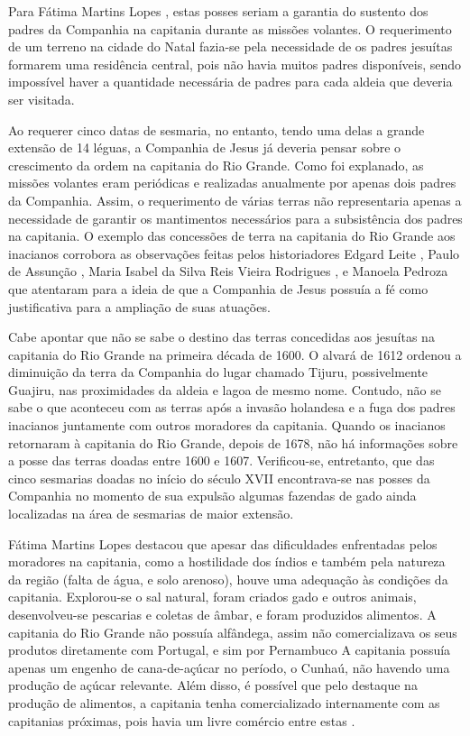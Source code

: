 Para Fátima Martins Lopes \citeyear[p.~107]{Lopes2003}, estas posses seriam a garantia do sustento dos padres da Companhia na capitania durante as missões volantes. O requerimento de um terreno na cidade do Natal fazia-se pela necessidade de os padres jesuítas formarem uma residência central, pois não havia muitos padres disponíveis, sendo impossível haver a quantidade necessária de padres para cada aldeia que deveria ser visitada. 

Ao requerer cinco datas de sesmaria, no entanto, tendo uma delas a grande extensão de 14 léguas, a Companhia de Jesus já deveria pensar sobre o crescimento da ordem na capitania do Rio Grande. Como foi explanado, as missões volantes eram periódicas e realizadas anualmente por apenas dois padres da Companhia. Assim, o requerimento de várias terras não representaria apenas a necessidade de garantir os mantimentos necessários para a subsistência dos padres na capitania. O exemplo das concessões de terra na capitania do Rio Grande aos inacianos corrobora as observações feitas pelos historiadores Edgard Leite \citeyear{Leite2000}, Paulo de Assunção \citeyear{Assuncao2004}, Maria Isabel da Silva Reis Vieira Rodrigues \citeyear{Rodrigues1997}, e Manoela Pedroza \citeyear{Pedroza2020} que atentaram para a ideia de que a Companhia de Jesus possuía a fé como justificativa para a ampliação de suas atuações. 

Cabe apontar que não se sabe o destino das terras concedidas aos jesuítas na capitania do Rio Grande na primeira década de 1600. O alvará de 1612 ordenou a diminuição da terra da Companhia do lugar chamado Tijuru, possivelmente Guajiru, nas proximidades da aldeia e lagoa de mesmo nome. Contudo, não se sabe o que aconteceu com as terras após a invasão holandesa e a fuga dos padres inacianos juntamente com outros moradores da capitania. Quando os inacianos retornaram à capitania do Rio Grande, depois de 1678, não há informações sobre a posse das terras doadas entre 1600 e 1607. Verificou-se, entretanto, que das cinco sesmarias doadas no início do século XVII encontrava-se nas posses da Companhia no momento de sua expulsão algumas fazendas de gado ainda localizadas na área de sesmarias de maior extensão.  

Fátima Martins Lopes \citeyear{Lopes2003} destacou que apesar das dificuldades enfrentadas pelos moradores na capitania, como a hostilidade dos índios e também pela natureza da região (falta de água, e solo arenoso), houve uma adequação às condições da capitania. Explorou-se o sal natural, foram criados gado e outros animais, desenvolveu-se pescarias e coletas de âmbar, e foram produzidos alimentos. A capitania do Rio Grande não possuía alfândega, assim não comercializava os seus produtos diretamente com Portugal, e sim por Pernambuco A capitania possuía apenas um engenho de cana-de-açúcar no período, o Cunhaú, não havendo uma produção de açúcar relevante. Além disso, é possível que pelo destaque na produção de alimentos, a capitania tenha comercializado internamente com as capitanias próximas, pois havia um livre comércio entre estas \cites[p.~191--196]{Dias2011}[p.~203--225]{Dias2018}. 

